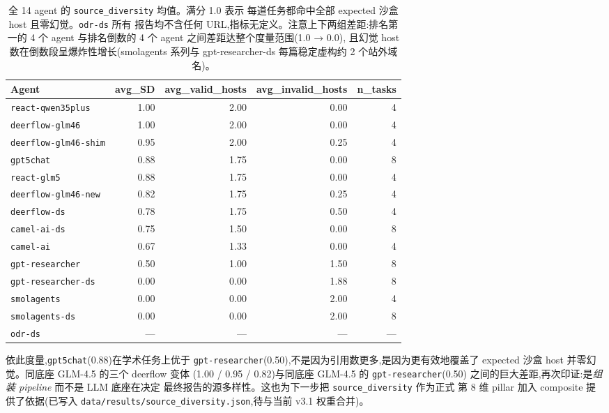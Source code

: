 \documentclass[UTF8,11pt]{ctexart}
\begin{document}
\begin{table}[h]
  \centering
  \small
  \begin{tabular}{lrrrr}
    \toprule
    Agent & avg\_SD & avg\_valid\_hosts & avg\_invalid\_hosts & n\_tasks \\
    \midrule
    \texttt{react-qwen35plus}    & 1.00 & 2.00 & 0.00 & 4 \\
    \texttt{deerflow-glm46}      & 1.00 & 2.00 & 0.00 & 4 \\
    \texttt{deerflow-glm46-shim} & 0.95 & 2.00 & 0.25 & 4 \\
    \texttt{gpt5chat}            & 0.88 & 1.75 & 0.00 & 8 \\
    \texttt{react-glm5}          & 0.88 & 1.75 & 0.00 & 4 \\
    \texttt{deerflow-glm46-new}  & 0.82 & 1.75 & 0.25 & 4 \\
    \texttt{deerflow-ds}         & 0.78 & 1.75 & 0.50 & 4 \\
    \texttt{camel-ai-ds}         & 0.75 & 1.50 & 0.00 & 8 \\
    \texttt{camel-ai}            & 0.67 & 1.33 & 0.00 & 4 \\
    \texttt{gpt-researcher}      & 0.50 & 1.00 & 1.50 & 8 \\
    \texttt{gpt-researcher-ds}   & 0.00 & 0.00 & 1.88 & 8 \\
    \texttt{smolagents}          & 0.00 & 0.00 & 2.00 & 4 \\
    \texttt{smolagents-ds}       & 0.00 & 0.00 & 2.00 & 8 \\
    \texttt{odr-ds}              & ---  & ---  & ---  & --- \\
    \bottomrule
  \end{tabular}
  \caption{全 14 agent 的 \texttt{source\_diversity} 均值。满分 1.0 表示
    每道任务都命中全部 expected 沙盒 host 且零幻觉。\texttt{odr-ds} 所有
    报告均不含任何 URL,指标无定义。注意上下两组差距:排名第一的 4 个
    agent 与排名倒数的 4 个 agent 之间差距达整个度量范围(1.0 → 0.0),
    且幻觉 host 数在倒数段呈爆炸性增长(smolagents 系列与 gpt-researcher-ds
    每篇稳定虚构约 2 个站外域名)。}
  \label{tab:sd}
\end{table}

依此度量,\texttt{gpt5chat}(0.88)在学术任务上优于
\texttt{gpt-researcher}(0.50),不是因为引用数更多,是因为更有效地覆盖了
expected 沙盒 host 并零幻觉。同底座 GLM-4.5 的三个 deerflow 变体
(1.00 / 0.95 / 0.82)与同底座 GLM-4.5 的 \texttt{gpt-researcher}(0.50)
之间的巨大差距,再次印证:是\emph{组装 pipeline} 而不是 LLM 底座在决定
最终报告的源多样性。这也为下一步把 \texttt{source\_diversity} 作为正式
第 8 维 pillar 加入 composite 提供了依据(已写入
\texttt{data/results/source\_diversity.json},待与当前 v3.1 权重合并)。
\end{document}
